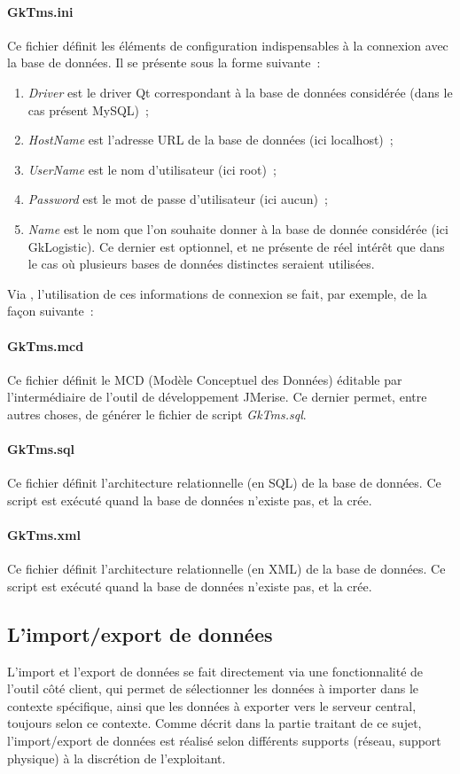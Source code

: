 \paragraph{GkTms.ini}
Ce fichier définit les éléments de configuration indispensables à la connexion avec la base de données.
Il se présente sous la forme suivante~:

\label{Database.properties}
\begin{enumerate}
	\item \emph{Driver} est le driver Qt correspondant à la base de données considérée (dans le cas présent MySQL)~;
	\item \emph{HostName} est l'adresse URL de la base de données (ici localhost)~;
	\item \emph{UserName} est le nom d'utilisateur (ici root)~;
	\item \emph{Password} est le mot de passe d'utilisateur (ici aucun)~;
	\item \emph{Name} est le nom que l'on souhaite donner à la base de donnée considérée (ici GkLogistic). Ce dernier est optionnel, et ne présente de réel intérêt que dans le cas où plusieurs bases de données distinctes seraient utilisées.
\end{enumerate}
Via \Qt, l'utilisation de ces informations de connexion se fait, par exemple, de la façon suivante~:

\paragraph{GkTms.mcd}
Ce fichier définit le MCD (Modèle Conceptuel des Données) éditable par l'intermédiaire de l'outil de développement JMerise.
Ce dernier permet, entre autres choses, de générer le fichier de script \emph{GkTms.sql}.

\paragraph{GkTms.sql}
Ce fichier définit l'architecture relationnelle (en SQL) de la base de données.
Ce script est exécuté quand la base de données n'existe pas, et la crée.

\paragraph{GkTms.xml}
Ce fichier définit l'architecture relationnelle (en XML) de la base de données.
Ce script est exécuté quand la base de données n'existe pas, et la crée.

\subsection{L'import/export de données}
L'import et l'export de données se fait directement via une fonctionnalité de l'outil côté client, qui permet de sélectionner les données à importer dans le contexte spécifique, ainsi que les données à exporter vers le serveur central, toujours selon ce contexte.
Comme décrit dans la partie traitant de ce sujet, l'import/export de données est réalisé selon différents supports (réseau, support physique) à la discrétion de l'exploitant.

